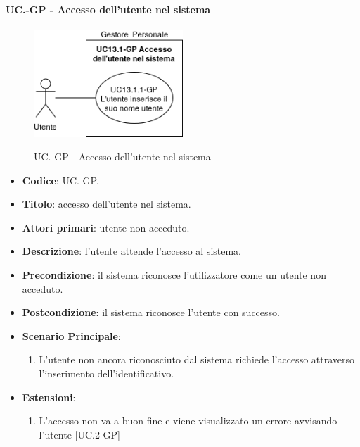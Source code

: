 	\paragraph{UC\theuccount.\thesubuccount-GP - Accesso dell'utente nel sistema}
		\begin{figure}[H]
			\centering
				\includegraphics[width=0.5\textwidth]{img/casi_d'uso/UC13_1.png}\\
			\caption{UC\theuccount.\thesubuccount-GP - Accesso dell'utente nel sistema}
		\end{figure}
		\begin{itemize}
			\item \textbf{Codice}: UC\theuccount.\thesubuccount-GP.
			\item \textbf{Titolo}: accesso dell'utente nel sistema.
			\item \textbf{Attori primari}: utente non acceduto.
			\item \textbf{Descrizione}: l'utente attende l'accesso al sistema.
			\item \textbf{Precondizione}: il sistema riconosce l'utilizzatore come un utente non acceduto.
			\item \textbf{Postcondizione}: il sistema riconosce l'utente con successo.
			\item \textbf{Scenario Principale}:
			\begin{enumerate}
				\item L’utente non ancora riconosciuto dal sistema richiede l'accesso attraverso l'inserimento dell'identificativo.
			\end{enumerate}
			\item \textbf{Estensioni}:
			\begin{enumerate}
				\item L'accesso non va a buon fine e viene visualizzato un errore avvisando l'utente [UC\theuccount.2-GP]
			\end{enumerate}
		\end{itemize}
		
		\newpage
		
